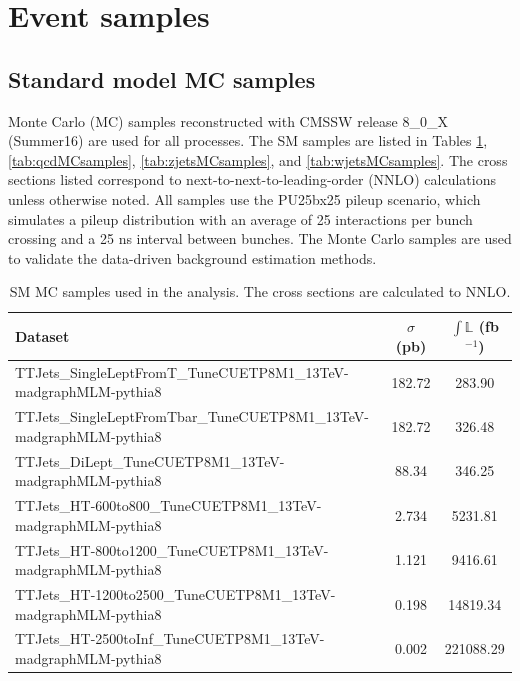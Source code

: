 \section{Event samples}
\label{sec:event-samples}

\subsection{Standard model MC samples}
\label{sec:sm-mc}
Monte Carlo (MC) samples reconstructed with CMSSW release 8\_0\_X (Summer16) are used for all processes. The SM samples are listed in Tables \ref{tab:ttbarMCsamples}, \ref{tab:qcdMCsamples}, \ref{tab:zjetsMCsamples}, and \ref{tab:wjetsMCsamples}. The cross sections listed correspond to next-to-next-to-leading-order (NNLO) calculations unless otherwise noted.  All samples use the PU25bx25 pileup scenario, which simulates a pileup distribution with an average of 25 interactions per bunch crossing and a 25 ns interval between bunches. The Monte Carlo samples are used to validate the data-driven background estimation methods.

\begin{table}[hp!]
\centering
\caption{SM \ttbar MC samples used in the analysis. The cross
  sections are calculated to NNLO. }
\label{tab:ttbarMCsamples}
{\footnotesize
\begin{tabular}{lcc}
\hline \hline
Dataset & $\sigma$ (pb) & $\int\mathbb{L}$ (fb$^{-1}$) \\
\hline
TTJets\_SingleLeptFromT\_TuneCUETP8M1\_13TeV-madgraphMLM-pythia8 & 182.72 & 283.90\\
TTJets\_SingleLeptFromTbar\_TuneCUETP8M1\_13TeV-madgraphMLM-pythia8 & 182.72 & 326.48\\
TTJets\_DiLept\_TuneCUETP8M1\_13TeV-madgraphMLM-pythia8 & 88.34 & 346.25\\
TTJets\_HT-600to800\_TuneCUETP8M1\_13TeV-madgraphMLM-pythia8 & 2.734 & 5231.81\\
TTJets\_HT-800to1200\_TuneCUETP8M1\_13TeV-madgraphMLM-pythia8 & 1.121 & 9416.61\\
TTJets\_HT-1200to2500\_TuneCUETP8M1\_13TeV-madgraphMLM-pythia8 & 0.198 & 14819.34\\
TTJets\_HT-2500toInf\_TuneCUETP8M1\_13TeV-madgraphMLM-pythia8 & 0.002 & 221088.29\\
\hline \hline
\end{tabular}
}
\end{table}

